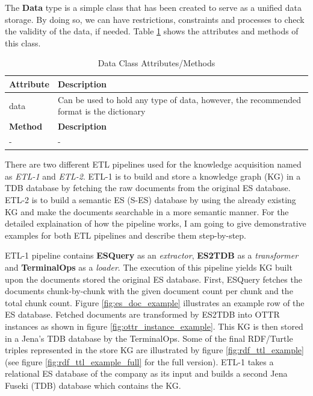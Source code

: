 The \textbf{Data} type is a simple class that has been created to serve as a unified data storage. 
By doing so, we can have restrictions, constraints and processes to check the validity of the data, 
if needed. Table \ref{tab:class_attr_data} shows the attributes and methods of this class.

\begin{table}[H]
	\centering
	\begin{tabular}{|p{}|p{}|}
		\hline
		\textbf{Attribute} & \textbf{Description} \\
		\hline
		data & Can be used to hold any type of data, however, the recommended format is the dictionary \\
		\hline
		\hline
		\textbf{Method} & \textbf{Description} \\
		\hline
		- & - \\
		\hline
	\end{tabular}
	\caption{Data Class Attributes/Methods}
	\label{tab:class_attr_data}
\end{table}

There are two different ETL pipelines used for the knowledge acquisition named as \textit{ETL-1} and 
\textit{ETL-2}. ETL-1 is to build and store a knowledge graph (KG) in a TDB database by fetching the raw 
documents from the original ES database. ETL-2 is to build a semantic ES (S-ES) database by using the 
already existing KG and make the documents searchable in a more semantic manner. For the detailed 
explaination of how the pipeline works, I am going to give demonstrative examples for both ETL pipelines 
and describe them step-by-step.

ETL-1 pipeline contains \textbf{ESQuery} as an \textit{extractor}, \textbf{ES2TDB} as a 
\textit{transformer} and \textbf{TerminalOps} as a \textit{loader}. The execution of this pipeline 
yields KG built upon the documents stored the original ES database. First, ESQuery 
fetches the documents chunk-by-chunk with the given document count per chunk and the total chunk count. 
Figure \ref{fig:es_doc_example} illustrates an example row of the ES database. Fetched documents are 
transformed by ES2TDB into OTTR instances as shown in figure \ref{fig:ottr_instance_example}.
This KG is then stored in a Jena's TDB database by the TerminalOps. Some of the final RDF/Turtle 
triples represented in the store KG are illustrated by figure \ref{fig:rdf_ttl_example} (see 
figure \ref{fig:rdf_ttl_example_full} for the full version). ETL-1 takes a relational ES database of 
the company as its input and builds a second Jena Fuseki (TDB) database which contains the KG.


